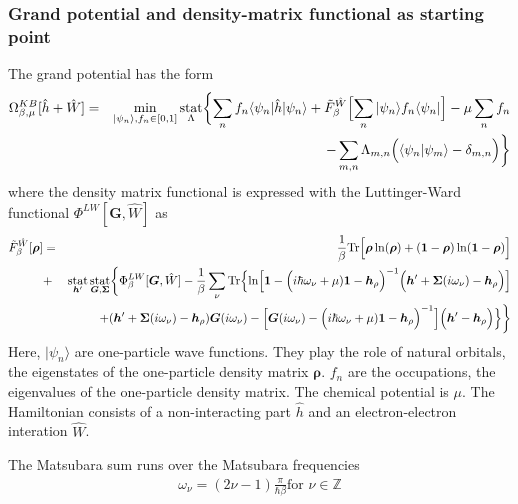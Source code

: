 \documentclass[11pt,a4paper]{report}
\newcommand{\mat}[1]{\bm{#1}}  %
\DeclareMathOperator*{\stat}{stat}
\begin{document}
\subsubsection{Grand potential and density-matrix 
functional as starting point}
The grand potential has the form
\begin{eqnarray}
\Omega^{KB}_{\beta,\mu}[\hat{h}+\hat{W}]
&=&\min_{|\psi_n\rangle,f_n\in[0,1]}\stat_\Lambda
\biggl\lbrace\sum_n f_n\langle\psi_n|\hat{h}|\psi_n\rangle
+\tilde{F}_\beta^{\hat{W}}\Bigl[\sum_n|\psi_n\rangle f_n\langle\psi_n|\Bigr]
-\mu\sum_n f_n\nonumber\\
&&
-\sum_{m,n}\Lambda_{m,n}\Bigl(\langle\psi_n|\psi_m\rangle-\delta_{m,n}\Bigr)
\biggr\rbrace
\label{eq:gcpdm2}
\end{eqnarray}
where the density matrix functional is expressed with the
Luttinger-Ward functional\cite{luttinger60_pr118_1417}
$\Phi^{LW}[\mat{G},\hat{W}]$ as
\begin{eqnarray}
\tilde{F}^{\hat{W}}_\beta[\mat{\rho}]
&=&
\frac{1}{\beta}\Tr\Bigl[
\mat{\rho}\ln(\mat{\rho})+(\mat{1}-\mat{\rho})\ln(\mat{1}-\mat{\rho})\Bigr]
\nonumber\\
&+&
\stat_{\mat{h}'}\stat_{\mat{G},\mat{\Sigma}}
\biggl\lbrace
\Phi^{LW}_\beta[\mat{G},\hat{W}]
-\frac{1}{\beta}\sum_\nu\Tr\Bigl\lbrace
\ln\Bigl[
\mat{1}-
\Bigl(i\hbar\omega_\nu+\mu)\mat{1}-\mat{h}_{\rho}\Bigr)^{-1}
\Bigl(\mat{h}'+\mat{\Sigma}(i\omega_\nu)-\mat{h}_{\rho}\Bigr)
\Bigr]
\nonumber\\&&
+(\mat{h}'+\mat{\Sigma}(i\omega_\nu)-\mat{h}_\rho)\mat{G}(i\omega_\nu)
-
\Bigl[
\mat{G}(i\omega_\nu)
-\Bigl(i\hbar\omega_\nu+\mu)\mat{1}-\mat{h}_{\rho}\Bigr)^{-1}
\Bigr]
\Bigl(\mat{h}'-\mat{h}_\rho\Bigr)\Bigr\rbrace
\biggr\rbrace
\label{eq:dmfgreen}
\end{eqnarray}
Here, $|\psi_n\rangle$ are one-particle wave functions. They play the
role of natural orbitals, the eigenstates of the one-particle density
matrix $\mat{\rho}$. $f_n$ are the occupations, the eigenvalues of the
one-particle density matrix. The chemical potential is $\mu$. The
Hamiltonian consists of a non-interacting part $\hat{h}$ and an
electron-electron interation $\hat{W}$.

The Matsubara sum runs over the Matsubara frequencies 
\begin{eqnarray}
\omega_\nu=(2\nu-1)\frac{\pi}{\hbar\beta}
\text{for $\nu\in\mathbb{Z}$}
\end{eqnarray}
\end{document}
